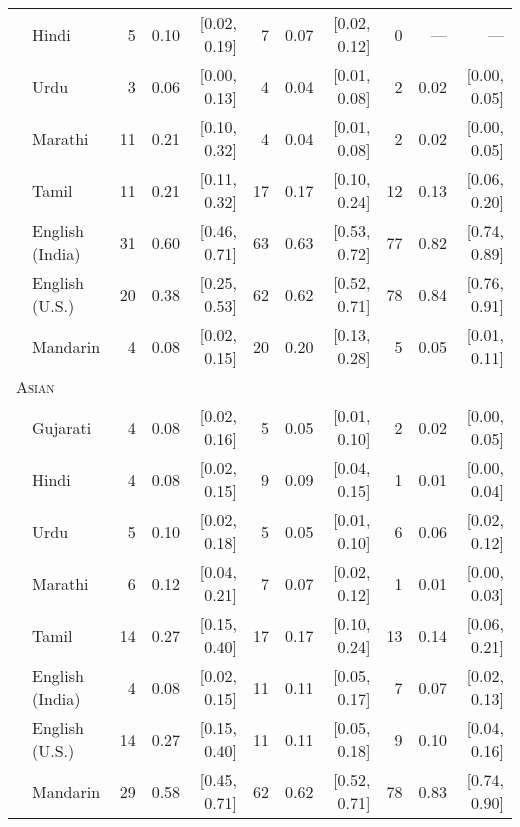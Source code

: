 \begin{table}[H]
\begin{footnotesize}
\begin{tabular}{p{.1in}lrrrrrrrrr}
 & Hindi & 5 & 0.10 & [0.02, 0.19] & 7 & 0.07 & [0.02, 0.12] & 0 & --- & ---\\

 & Urdu & 3 & 0.06 & [0.00, 0.13] & 4 & 0.04 & [0.01, 0.08] & 2 & 0.02 & [0.00, 0.05]\\

 & Marathi & 11 & 0.21 & [0.10, 0.32] & 4 & 0.04 & [0.01, 0.08] & 2 & 0.02 & [0.00, 0.05]\\

 & Tamil & 11 & 0.21 & [0.11, 0.32] & 17 & 0.17 & [0.10, 0.24] & 12 & 0.13 & [0.06, 0.20]\\

 & English (India) & 31 & 0.60 & [0.46, 0.71] & 63 & 0.63 & [0.53, 0.72] & 77 & 0.82 & [0.74, 0.89]\\

 & English (U.S.) & 20 & 0.38 & [0.25, 0.53] & 62 & 0.62 & [0.52, 0.71] & 78 & 0.84 & [0.76, 0.91]\\

& Mandarin & 4 & 0.08 & [0.02, 0.15] & 20 & 0.20 & [0.13, 0.28] & 5 & 0.05 & [0.01, 0.11]\\
\midrule
\multicolumn{11}{l}{\textsc{Asian}}\\
& Gujarati & 4 & 0.08 & [0.02, 0.16] & 5 & 0.05 & [0.01, 0.10] & 2 & 0.02 & [0.00, 0.05]\\

 & Hindi & 4 & 0.08 & [0.02, 0.15] & 9 & 0.09 & [0.04, 0.15] & 1 & 0.01 & [0.00, 0.04]\\

 & Urdu & 5 & 0.10 & [0.02, 0.18] & 5 & 0.05 & [0.01, 0.10] & 6 & 0.06 & [0.02, 0.12]\\

 & Marathi & 6 & 0.12 & [0.04, 0.21] & 7 & 0.07 & [0.02, 0.12] & 1 & 0.01 & [0.00, 0.03]\\

 & Tamil & 14 & 0.27 & [0.15, 0.40] & 17 & 0.17 & [0.10, 0.24] & 13 & 0.14 & [0.06, 0.21]\\

 & English (India) & 4 & 0.08 & [0.02, 0.15] & 11 & 0.11 & [0.05, 0.17] & 7 & 0.07 & [0.02, 0.13]\\

 & English (U.S.) & 14 & 0.27 & [0.15, 0.40] & 11 & 0.11 & [0.05, 0.18] & 9 & 0.10 & [0.04, 0.16]\\

& Mandarin & 29 & 0.58 & [0.45, 0.71] & 62 & 0.62 & [0.52, 0.71] & 78 & 0.83 & [0.74, 0.90]\\
\bottomrule
\end{tabular}
\end{footnotesize}
\end{table}